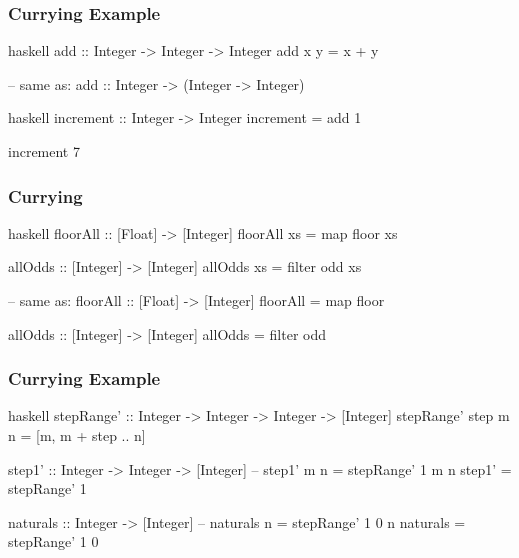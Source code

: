 \documentclass[dvipsnames]{beamer}
\theoremstyle{plain}
\begin{document}
\begin{frame}[fragile]
  \frametitle{Currying Example}

  \begin{exampleblock}{}
    \begin{pygments}{haskell}
add :: Integer -> Integer -> Integer
add x y = x + y

-- same as: add :: Integer -> (Integer -> Integer)
    \end{pygments}

    \pause
    \medskip
    \begin{pygments}{haskell}
increment :: Integer -> Integer
increment = add 1

increment 7
    \end{pygments}
  \end{exampleblock}
\end{frame}

\begin{frame}[fragile]
  \frametitle{Currying}

  \begin{exampleblock}{}
    \begin{pygments}{haskell}
floorAll :: [Float] -> [Integer]
floorAll xs = map floor xs

allOdds :: [Integer] -> [Integer]
allOdds xs = filter odd xs

-- same as:
floorAll :: [Float] -> [Integer]
floorAll = map floor

allOdds :: [Integer] -> [Integer]
allOdds = filter odd
    \end{pygments}
  \end{exampleblock}
\end{frame}

\begin{frame}[fragile]
  \frametitle{Currying Example}

  \begin{exampleblock}{}
    \begin{pygments}{haskell}
stepRange' :: Integer -> Integer -> Integer ->
                  [Integer]
stepRange' step m n = [m, m + step .. n]

step1' :: Integer -> Integer -> [Integer]
-- step1' m n = stepRange' 1 m n
step1' = stepRange' 1

naturals :: Integer -> [Integer]
-- naturals n = stepRange' 1 0 n
naturals = stepRange' 1 0
    \end{pygments}
  \end{exampleblock}
\end{frame}
\end{document}

